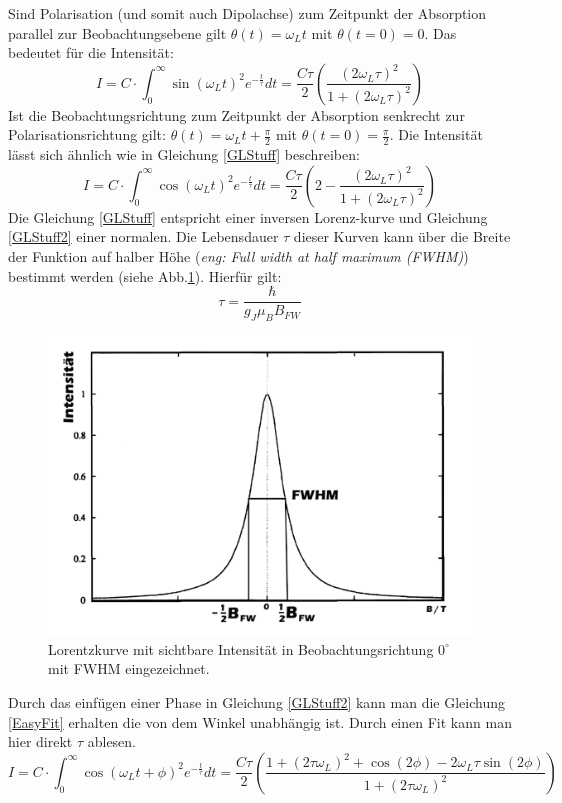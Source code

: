 Sind Polarisation (und somit auch Dipolachse) zum Zeitpunkt der Absorption parallel zur Beobachtungsebene gilt $\theta(t)=\omega_Lt$ mit $\theta(t=0)=0$. Das bedeutet für die Intensität:
\begin{equation}
	I=C\cdot \int_{0}^{\infty}\sin(\omega_Lt)^2e^{-\frac{t}{\tau}}dt=\frac{C\tau}{2}\left(\frac{(2\omega_L\tau)^2}{1+(2\omega_L\tau)^2}\right)
	\label{GLStuff}
\end{equation}
Ist die Beobachtungsrichtung zum Zeitpunkt der Absorption senkrecht zur Polarisationsrichtung gilt: $\theta(t)=\omega_Lt+\frac{\pi}{2}$ mit $\theta(t=0)=\frac{\pi}{2}$. Die Intensität lässt sich ähnlich wie in Gleichung \ref{GLStuff} beschreiben:
\begin{equation}
I=C\cdot \int_{0}^{\infty}\cos(\omega_Lt)^2e^{-\frac{t}{\tau}}dt=\frac{C\tau}{2}\left(2-\frac{(2\omega_L\tau)^2}{1+(2\omega_L\tau)^2}\right)
\label{GLStuff2}
\end{equation}
Die Gleichung \ref{GLStuff} entspricht einer inversen Lorenz-kurve und Gleichung \ref{GLStuff2} einer normalen. Die Lebensdauer $\tau$ dieser Kurven kann über die Breite der Funktion auf halber Höhe (\textit{eng: Full width at half maximum (FWHM)}) bestimmt werden (siehe Abb.\ref{Lorenzbild}). Hierfür gilt:
\begin{equation}
	\tau=\frac{\hbar}{g_J\mu_BB_{FW}}
	\label{tau}
\end{equation}
\begin{figure}[ht]
	\includegraphics[scale=0.7]{Bild/Lorenz}
	\centering
	\caption[Lorentzkurve]{Lorentzkurve mit sichtbare Intensität in Beobachtungsrichtung $0^\circ$ mit FWHM eingezeichnet.\cite{anleitung}}
	\label{Lorenzbild}
\end{figure}
Durch das einfügen einer Phase in Gleichung \ref{GLStuff2} kann man die Gleichung \ref{EasyFit} erhalten die von dem Winkel unabhängig ist. Durch einen Fit kann man hier direkt $\tau$ ablesen.
\begin{equation}
I=C\cdot \int_{0}^{\infty}\cos(\omega_Lt+\phi)^2e^{-\frac{t}{\tau}}dt=\frac{C\tau}{2}\left(\frac{1+(2\tau\omega_L)^2+\cos(2\phi)-2\omega_L\tau\sin(2\phi)}{1+(2\tau\omega_L)^2}\right)
\label{EasyFit}
\end{equation}
